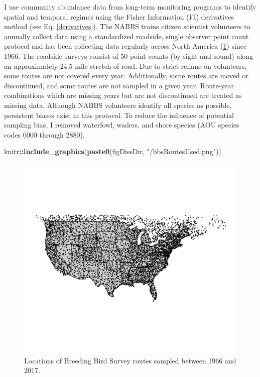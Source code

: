 \documentclass[12pt,twoside,openany]{reedthesis}
\newenvironment{Shaded}{\begin{snugshade}}{\end{snugshade}}
\newcommand{\KeywordTok}[1]{\textcolor[rgb]{0.13,0.29,0.53}{\textbf{#1}}}
\newcommand{\StringTok}[1]{\textcolor[rgb]{0.31,0.60,0.02}{#1}}
\newcommand{\OperatorTok}[1]{\textcolor[rgb]{0.81,0.36,0.00}{\textbf{#1}}}
\newcommand{\NormalTok}[1]{#1}
\begin{document}
I use community abundance data from long-term monitoring programs to
identify spatial and temporal regimes using the Fisher Information (FI)
derivatives method (see Eq. \ref{derivatives}). The NABBS trains citizen
scientist volunteers to annually collect data using a standardized
roadside, single observer point count protocol and has been collecting
data regularly across North America (\ref{fig:bbsPoints}) since 1966.
The roadside surveys consist of 50 point counts (by sight and sound)
along an approximately 24.5 mile stretch of road. Due to strict reliane
on volunteers, some routes are not covered every year. Additionally,
some routes are moved or discontinued, and some routes are not sampled
in a given year. Route-year combinations which are missing years but are
not discontinued are treated as missing data. Although NABBS volunteers
identify all species as possible, persistent biases exist in this
protocol. To reduce the influence of potential sampling bias, I removed
waterfowl, waders, and shore species (AOU species codes 0000 through
2880).
\begin{Shaded}
\begin{Highlighting}[]
\NormalTok{knitr}\OperatorTok{::}\KeywordTok{include_graphics}\NormalTok{(}\KeywordTok{paste0}\NormalTok{(figDissDir, }\StringTok{"/bbsRoutesUsed.png"}\NormalTok{))}
\end{Highlighting}
\end{Shaded}
\begin{figure}
\includegraphics[width=30.03in]{./chapterFiles/fisherSpatial/figures/figsCalledInDiss/bbsRoutesUsed} \caption{Locations of Breeding Bird Survey routes sampled between 1966 and 2017.}\label{fig:bbsPoints}
\end{figure}
\end{document}
